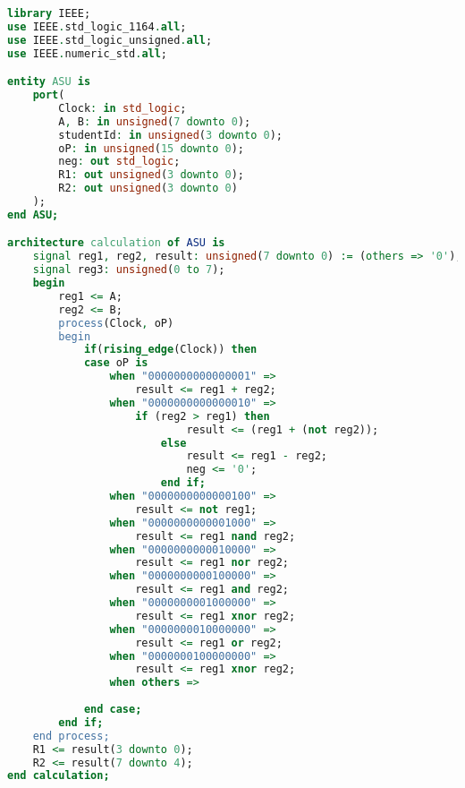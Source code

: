 \begin{lstlisting}[language=VHDL, caption={VHDL code for the General Purpose ALU}]
library IEEE;
use IEEE.std_logic_1164.all;
use IEEE.std_logic_unsigned.all;
use IEEE.numeric_std.all;

entity ASU is
    port(
        Clock: in std_logic;
        A, B: in unsigned(7 downto 0);
        studentId: in unsigned(3 downto 0);
        oP: in unsigned(15 downto 0);
        neg: out std_logic;
        R1: out unsigned(3 downto 0);
        R2: out unsigned(3 downto 0)
    );
end ASU;

architecture calculation of ASU is
    signal reg1, reg2, result: unsigned(7 downto 0) := (others => '0');
    signal reg3: unsigned(0 to 7);
    begin
        reg1 <= A;
        reg2 <= B;
        process(Clock, oP)
        begin
            if(rising_edge(Clock)) then 
            case oP is
                when "0000000000000001" =>
                    result <= reg1 + reg2;
                when "0000000000000010" =>
                    if (reg2 > reg1) then
                            result <= (reg1 + (not reg2));
                        else
                            result <= reg1 - reg2;
                            neg <= '0';
                        end if;
                when "0000000000000100" =>
                    result <= not reg1;
                when "0000000000001000" =>
                    result <= reg1 nand reg2;
                when "0000000000010000" =>
                    result <= reg1 nor reg2;
                when "0000000000100000" =>
                    result <= reg1 and reg2;
                when "0000000001000000" =>
                    result <= reg1 xnor reg2;
                when "0000000010000000" =>
                    result <= reg1 or reg2;
                when "0000000100000000" =>
                    result <= reg1 xnor reg2;
                when others =>
                
            end case;
        end if;
    end process;
    R1 <= result(3 downto 0);
    R2 <= result(7 downto 4);
end calculation;
\end{lstlisting}
